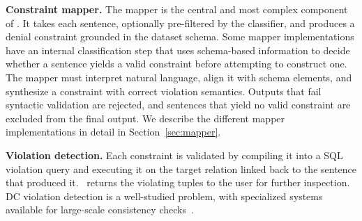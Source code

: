 \smallskip\noindent\textbf{Constraint mapper.}
The mapper is the central and most complex component of \system. It takes each sentence, optionally pre-filtered by the classifier, and produces a denial constraint grounded in the dataset schema. Some mapper implementations have an internal classification step that uses schema-based information to decide whether a sentence yields a valid constraint before attempting to construct one.
The mapper must interpret natural language, align it with schema elements, and synthesize a constraint with correct violation semantics. Outputs that fail syntactic validation are rejected, and sentences that yield no valid constraint are excluded from the final output. \DIFdelbegin {}\DIFdelend We describe the different mapper implementations in detail in Section~\ref{sec:mapper}.


\smallskip\noindent\textbf{Violation detection.}
Each constraint is validated by compiling it into a SQL violation query and executing it on the target relation \DIFdelbegin {}\DIFdelend \DIFaddbegin {}\DIFaddend linked back to the sentence that produced it. \system\ returns the violating tuples to the user for further inspection. DC violation detection is a well-studied problem, with specialized systems available for large-scale consistency checks~\cite{facet2021,liu2024rapidash,youri2024}.

